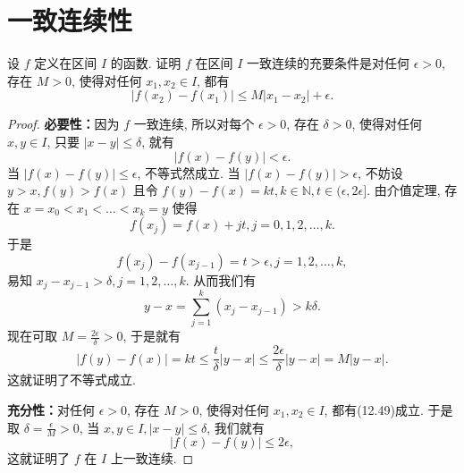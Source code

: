 \documentclass[lang=cn,10pt,thmcnt=section]{elegantbook}
\begin{document}
\section{一致连续性}
\begin{example}
	设 $f$ 定义在区间 $I$ 的函数. 证明 $f$ 在区间 $I$ 一致连续的充要条件是对任何 $\epsilon > 0$, 存在 $M > 0$, 使得对任何 $x_1, x_2 \in I$, 都有
	\[
	|f(x_2) - f(x_1)| \le M|x_1 - x_2| + \epsilon.
	\]
\end{example}
\begin{proof}
	\textbf{必要性：}因为 $f$ 一致连续, 所以对每个 $\epsilon > 0$, 存在 $\delta > 0$, 使得对任何 $x,y \in I$, 只要 $|x-y| \le \delta$, 就有
	\[
	|f(x)-f(y)| < \epsilon. 
	\]
	当 $|f(x)-f(y)| \le \epsilon$, 不等式然成立. 当 $|f(x)-f(y)| > \epsilon$, 不妨设 $y>x, f(y)>f(x)$ 且令 $f(y)-f(x) = kt, k \in \mathbb{N}, t \in (\epsilon, 2\epsilon]$. 由介值定理, 存在 $x=x_0 < x_1 < \dots < x_k = y$ 使得
	\[
	f(x_j) = f(x) + jt, j=0, 1, 2, \dots, k.
	\]
	于是
	\[
	f(x_j) - f(x_{j-1}) = t > \epsilon, j=1, 2, \dots, k,
	\]
	易知 $x_j - x_{j-1} > \delta, j=1, 2, \dots, k$. 从而我们有
	\[
	y-x = \sum_{j=1}^k (x_j - x_{j-1}) > k\delta.
	\]
	现在可取 $M=\frac{2\epsilon}{\delta} > 0$, 于是就有
	\[
	|f(y)-f(x)| = kt \le \frac{t}{\delta}|y-x| \le \frac{2\epsilon}{\delta}|y-x| = M|y-x|.
	\]
	这就证明了不等式成立.
	
	\textbf{充分性：}对任何 $\epsilon > 0$, 存在 $M>0$, 使得对任何 $x_1, x_2 \in I$, 都有(12.49)成立. 于是取 $\delta = \frac{\epsilon}{M}>0$, 当 $x,y \in I, |x-y|\le \delta$, 我们就有
	\[
	|f(x)-f(y)| \le 2\epsilon,
	\]
	这就证明了 $f$ 在 $I$ 上一致连续.
	\end{proof}
	
\end{document}
